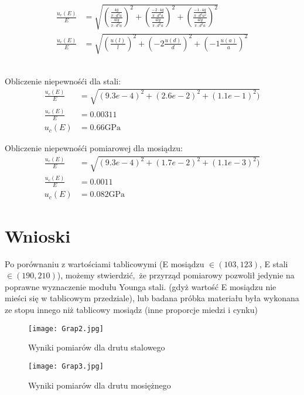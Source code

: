 \documentclass[12pt]{article}
\begin{document}
\begin{align}
    \frac{u_{c}(E)}{E} &= \sqrt{ \left( \frac{ \frac{4g}{\pi \cdot d^{2} a}}{ \frac{4lg}{\pi \cdot d^{2} a }} \right)^{2} 
                               + \left( \frac{ \frac{-2 \cdot 4g}{\pi \cdot d^{3} a}}{ \frac{4lg}{\pi \cdot d^{2} a }} \right)^{2} 
                               + \left( \frac{ \frac{-1 \cdot 4g}{\pi \cdot d^{2} a^{2}}}{ \frac{4lg}{\pi \cdot d^{2} a }} \right)^{2} } \\
    \frac{u_{c}(E)}{E} &= \sqrt{ \left(\frac{u(l)}{l}\right)^{2} + \left(-2 \frac{u(d)}{d}\right)^{2} +\left(-1 \frac{u(a)}{a}\right)^{2} } 
\end{align}
\\
\begin{multicols}{2}
Obliczenie niepewnośći dla stali:
\begin{align}
    \frac{u_{c}(E)}{E} &= \sqrt{ (9.3e-4)^{2} + ( 2.6e-2 )^{2} + (1.1e-1)^{2})}\\
    \frac{u_{c}(E)}{E} &= 0.00311\\
    u_{c}(E) &= 0.66\si{\GPa}
\end{align}

Obliczenie niepewnośći pomiarowej dla mosiądzu:
\begin{align}
    \frac{u_{c}(E)}{E} &= \sqrt{ (9.3e-4)^{2} + ( 1.7e-2 )^{2} + (1.1e-3)^{2})}\\
    \frac{u_{c}(E)}{E} &= 0.0011\\
    u_{c}(E) &= 0.082\si{\GPa}
\end{align}
\end{multicols}

\section{Wnioski}
Po porównaniu z wartościami tablicowymi (E mosiądzu $\in (103, 123)$, E stali $\in (190, 210)$), możemy stwierdzić, że przyrząd pomiarowy pozwolił jedynie na poprawne wyznaczenie modułu Younga stali. (gdyż wartość E mosiądzu nie mieści się w tablicowym przedziale), lub badana próbka materiału była wykonana ze stopu innego niż tablicowy mosiądz (inne proporcje miedzi i cynku)

\begin{figure}[b]
  \centering
  \texttt{[image: Grap2.jpg]}
  \caption{Wyniki pomiarów dla drutu stalowego}
  \centering
  \texttt{[image: Grap3.jpg]}
  \caption{Wyniki pomiarów dla drutu mosiężnego}
\end{figure}
\end{document}
